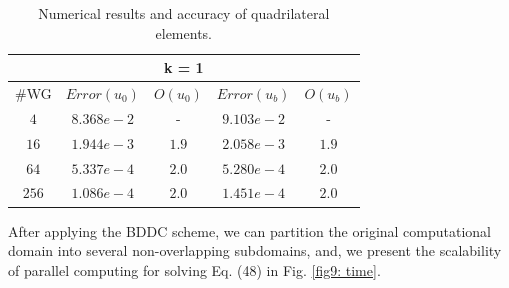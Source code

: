 \begin{table}[H]
{\begin{center}
\begin{minipage}{0.5\textwidth}
\begin{tabular}{c|c|c|c|c}
												\hline
												\multicolumn{5}{c}{ k = 1} \\
												\hline
												\#WG & $ Error (u_{0}) $ & $ O(u_{0}) $ & $ Error(u_{b})  $& $ O(u_{b})  $\\
												\hline
												$ 4 $ & $ 8.368e-2 $ & - & $ 9.103e-2 $ & - \\
												\hline
												$ 16 $ & $ 1.944e-3 $ & $ 1.9 $& $ 2.058e-3 $ & $ 1.9 $ \\
												\hline
												$ 64 $ & $ 5.337e-4 $ & $ 2.0 $ & $ 5.280e-4 $ & $ 2.0 $ \\
												\hline
												$ 256 $ & $ 1.086e-4 $ & $ 2.0 $ & $ 1.451e-4 $ & $ 2.0 $\\
												\hline
											\end{tabular}
										\end{minipage}
										
									\end{center} }
									\caption{Numerical results and accuracy of quadrilateral elements.}
									\label{Tab: quadMesh}
								\end{table}
								
								After applying the BDDC scheme, we can partition the original computational domain into several non-overlapping subdomains, and, we present the scalability of parallel computing for solving Eq. (48) in Fig. \ref{fig9: time}.
								

